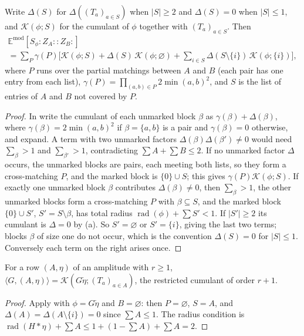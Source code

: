 \documentclass[11pt,colorlinks]{charlie}
\newcommand{\rad}{\operatorname{rad}}
\newcommand{\Ka}{\mathcal{K}}
\newcommand{\Wk}[1]{{:}#1{:}}
\begin{document}
\begin{lemma}\label{lem:contraction}
Write $\Delta(S)$ for $\Delta((T_a)_{a\in S})$ when $|S|\ge2$ and $\Delta(S)=0$ when $|S|\le1$, and $\Ka(\phi;S)$ for the cumulant of $\phi$ together with $(T_a)_{a\in S}$. Then
\begin{multline*}
 \mathbb E^{\mathrm{mod}}[S_\phi\Wk{Z_A}\Wk{Z_B}]\\
 =\sum_P\gamma(P)\Big[\Ka(\phi;S)+\Delta(S)\,\Ka(\phi;\varnothing)+\sum_{i\in S}\Delta(S\setminus\{i\})\,\Ka(\phi;\{i\})\Big],
\end{multline*}
where $P$ runs over the partial matchings between $A$ and $B$ (each pair has one entry from each list), $\gamma(P)=\prod_{(a,b)\in P}2\min(a,b)^2$, and $S$ is the list of entries of $A$ and $B$ not covered by $P$.
\end{lemma}
\begin{proof}
In  write the cumulant of each unmarked block $\beta$ as $\gamma(\beta)+\Delta(\beta)$, where $\gamma(\beta)=2\min(a,b)^2$ if $\beta=\{a,b\}$ is a pair and $\gamma(\beta)=0$ otherwise, and expand. A term with two unmarked factors $\Delta(\beta)\Delta(\beta')\ne0$ would need $\sum_\beta>1$ and $\sum_{\beta'}>1$, contradicting $\sum A+\sum B\le2$. If no unmarked factor $\Delta$ occurs, the unmarked blocks are pairs, each meeting both lists, so they form a cross-matching $P$, and the marked block is $\{0\}\cup S$; this gives $\gamma(P)\Ka(\phi;S)$. If exactly one unmarked block $\beta$ contributes $\Delta(\beta)\ne0$, then $\sum_\beta>1$, the other unmarked blocks form a cross-matching $P$ with $\beta\subseteq S$, and the marked block $\{0\}\cup S'$, $S'=S\setminus\beta$, has total radius $\rad(\phi)+\sum S'<1$. If $|S'|\ge2$ its cumulant is $\Delta=0$ by (a). So $S'=\varnothing$ or $S'=\{i\}$, giving the last two terms; blocks $\beta$ of size one do not occur, which is the convention $\Delta(S)=0$ for $|S|\le1$. Conversely each term on the right arises once.
\end{proof}

\begin{corollary}\label{cor:central}
For a row $(A,\eta)$ of an amplitude with $r\ge1$, $\langle G,(A,\eta)\rangle=\Ka(G\check\eta;(T_a)_{a\in A})$, the restricted cumulant of order $r+1$.
\end{corollary}
\begin{proof}
Apply  with $\phi=G\check\eta$ and $B=\varnothing$: then $P=\varnothing$, $S=A$, and $\Delta(A)=\Delta(A\setminus\{i\})=0$ since $\sum A\le1$. The radius condition is $\rad(H*\eta)+\sum A\le1+(1-\sum A)+\sum A=2$.
\end{proof}
\end{document}
